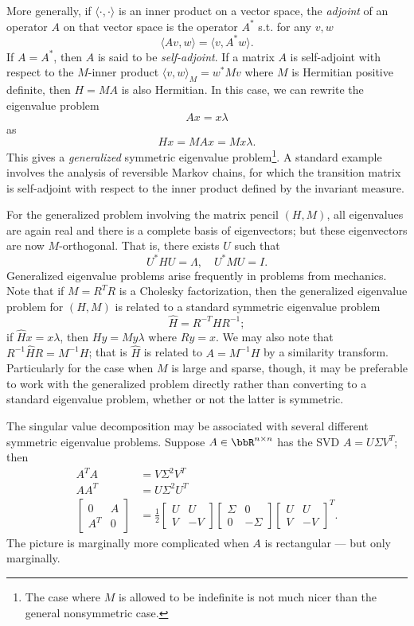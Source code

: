 \documentclass[12pt, leqno]{article} %
\begin{document}
More generally, if $\langle \cdot, \cdot \rangle$ is an inner product on
a vector space, the {\em adjoint} of an operator $A$ on that vector
space is the operator $A^*$ s.t. for any $v, w$
\[
  \langle Av, w \rangle = \langle v, A^* w \rangle.
\]
If $A = A^*$, then $A$ is said to be {\em self-adjoint}.
If a matrix $A$ is self-adjoint with respect to the $M$-inner product
$\langle v, w \rangle_M = w^* M v$ where $M$ is Hermitian positive
definite, then $H = M A$ is also Hermitian.  In this case, we can rewrite the
eigenvalue problem
\[
  Ax = x \lambda
\]
as
\[
  Hx = MA x = Mx \lambda.
\]
This gives a {\em generalized} symmetric eigenvalue problem\footnote{%
The case where $M$ is allowed to be indefinite is not much nicer
than the general nonsymmetric case.}.  A standard example involves
the analysis of reversible Markov chains, for which the transition
matrix is self-adjoint with respect to the inner product
defined by the invariant measure.

For the generalized problem involving the matrix pencil $(H,M)$,
all eigenvalues are again real and there is a
complete basis of eigenvectors; but these eigenvectors are now
$M$-orthogonal.  That is, there exists $U$ such that
\[
  U^* H U = \Lambda, \quad U^* M U = I.
\]
Generalized eigenvalue problems arise frequently in problems from
mechanics.  Note that if $M = R^T R$ is a Cholesky factorization,
then the generalized eigenvalue problem for $(H,M)$ is related to
a standard symmetric eigenvalue problem
\[
  \hat{H} = R^{-T} H R^{-1};
\]
if $\hat{H} x = x \lambda$, then $H y = M y \lambda$ where $Ry = x$.
We may also note that $R^{-1} \hat{H} R = M^{-1} H$; that is
$\hat{H}$ is related to $A = M^{-1} H$ by a similarity transform.
Particularly for the case when $M$ is large and sparse, though,
it may be preferable to work with the generalized problem directly
rather than converting to a standard eigenvalue problem, whether or
not the latter is symmetric.

The singular value decomposition may be associated with several
different symmetric eigenvalue problems.  Suppose $A \in \bbR^{n \times n}$
has the SVD $A = U \Sigma V^T$; then
\begin{align*}
  A^T A &= V \Sigma^2 V^T \\
  A A^T &= U \Sigma^2 U^T \\
  \begin{bmatrix}
    0 & A \\
    A^T & 0
  \end{bmatrix} &=
  \frac{1}{2}
  \begin{bmatrix}
    U & U \\
    V & -V
  \end{bmatrix}
  \begin{bmatrix}
    \Sigma & 0 \\
    0 & -\Sigma
  \end{bmatrix}
  \begin{bmatrix}
     U &  U \\
     V & -V
  \end{bmatrix}^T.
\end{align*}
The picture is marginally more complicated when $A$ is rectangular ---
but only marginally.
\end{document}
